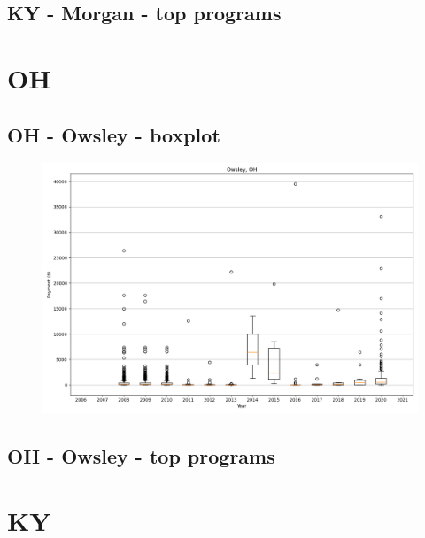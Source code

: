 \subsection*{KY - Morgan - top programs}

\newpage
\section*{OH}
\subsection*{OH - Owsley - boxplot}
\begin{figure}[h]
\centering
\includegraphics[width=7in]{../output/boxplots/counties/Owsley-OH_boxplot.png}
\end{figure}


\subsection*{OH - Owsley - top programs}

\newpage
\section*{KY}

